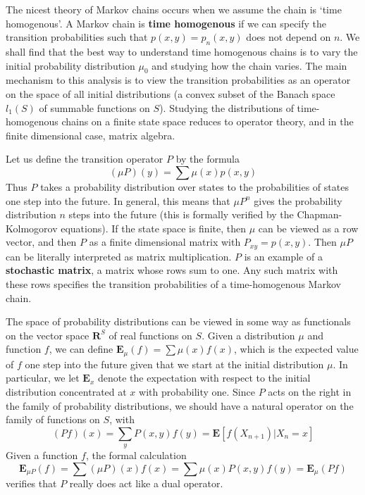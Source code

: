 The nicest theory of Markov chains occurs when we assume the chain is `time homogenous'. A Markov chain is {\bf time homogenous} if we can specify the transition probabilities such that $p(x,y) = p_n(x,y)$ does not depend on $n$. We shall find that the best way to understand time homogenous chains is to vary the initial probability distribution $\mu_0$ and studying how the chain varies. The main mechanism to this analysis is to view the transition probabilities as an operator on the space of all initial distributions (a convex subset of the Banach space $l_1(S)$ of summable functions on $S$). Studying the distributions of time-homogenous chains on a finite state space reduces to operator theory, and in the finite dimensional case, matrix algebra.

Let us define the transition operator $P$ by the formula
%
\[ (\mu P)(y) = \sum \mu(x) p(x,y) \]
%
Thus $P$ takes a probability distribution over states to the probabilities of states one step into the future. In general, this means that $\mu P^n$ gives the probability distribution $n$ steps into the future (this is formally verified by the Chapman-Kolmogorov equations). If the state space is finite, then $\mu$ can be viewed as a row vector, and then $P$ as a finite dimensional matrix with $P_{xy} = p(x,y)$. Then $\mu P$ can be literally interpreted as matrix multiplication. $P$ is an example of a {\bf stochastic matrix}, a matrix whose rows sum to one. Any such matrix with these rows specifies the transition probabilities of a time-homogenous Markov chain.

The space of probability distributions can be viewed in some way as functionals on the vector space $\mathbf{R}^S$ of real functions on $S$. Given a distribution $\mu$ and function $f$, we can define $\mathbf{E}_\mu(f) = \sum \mu(x)f(x)$, which is the expected value of $f$ one step into the future given that we start at the initial distribution $\mu$. In particular, we let $\mathbf{E}_x$ denote the expectation with respect to the initial distribution concentrated at $x$ with probability one. Since $P$ acts on the right in the family of probability distributions, we should have a natural operator on the family of functions on $S$, with
%
\[ (Pf)(x) = \sum_y P(x,y) f(y) = \mathbf{E}[f(X_{n+1})|X_n = x] \]
%
Given a function $f$, the formal calculation
%
\[ \mathbf{E}_{\mu P}(f) = \sum (\mu P)(x) f(x) = \sum \mu(x) P(x,y) f(y) = \mathbf{E}_\mu(Pf) \]
%
verifies that $P$ really does act like a dual operator.


